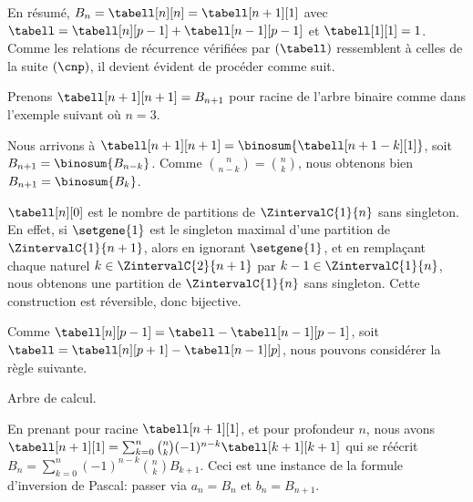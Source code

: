 En résumé,
$B_n = \tabell[n][n] = \tabell[n+1][1]$
avec
$\tabell = \tabell[n][p-1] + \tabell[n-1][p-1]$
et
$\tabell[1][1] = 1$.
Comme les relations de récurrence vérifiées par $(\tabell)$ ressemblent à celles de la suite $(\cnp)$,
il devient évident de procéder comme suit.

\explaintree{\tabell}{\tabell[n-1][p-1]}{\tabell[n][p-1]}%
            {\bellintertree}{}

Prenons $\tabell[n+1][n+1] = B_{n+1}$ pour racine de l'arbre binaire comme dans l'exemple suivant où $n = 3$.


Nous arrivons à
$\tabell[n+1][n+1] = \binosum{\tabell[n+1-k][1]}$,
soit
$B_{n+1} = \binosum{B_{n-k}}$.
Comme $\binom{n}{n-k} = \binom{n}{k}$, nous obtenons bien 
$B_{n+1} = \binosum{B_k}$.




\begin{remark} \label{val-bell-n-0}
    $\tabell[n][0]$ est le nombre de partitions de $\ZintervalC{1}{n}$ sans singleton.
    En effet,
    si $\setgene{1}$ est le singleton maximal d'une partition de $\ZintervalC{1}{n+1}$,
    alors
    en ignorant $\setgene{1}$, 
    et
    en remplaçant chaque naturel $k \in \ZintervalC{2}{n+1}$ par $k-1 \in \ZintervalC{1}{n}$, nous obtenons une partition de $\ZintervalC{1}{n}$ sans singleton.
    Cette construction est réversible, donc bijective.
\end{remark}




\begin{remark}
	Comme $\tabell[n][p-1] = \tabell - \tabell[n-1][p-1]$,
	soit $\tabell = \tabell[n][p+1] - \tabell[n-1][p]$,
	nous pouvons considérer la règle suivante.

    \begin{center}
    	\itshape\centering
    
    	\calctree{\tabell}{\tabell[n][p+1]}{-\tabell[n-1][p]}
    	
    	Arbre de calcul.
    \end{center}
    
    En prenant pour racine $\tabell[n+1][1]$, et pour profondeur $n$,
	nous avons
    $\tabell[n+1][1] = \sum_{k=0}^n \binom{n}{k} (-1)^{n-k} \tabell[k+1][k+1]$
    qui se réécrit
    $B_n = \sum_{k=0}^n (-1)^{n-k} \binom{n}{k} B_{k+1}$.
	Ceci est une instance de la formule d'inversion de Pascal:
    passer via
    $a_n = B_n$
    et
    $b_n = B_{n+1}$.
\end{remark}